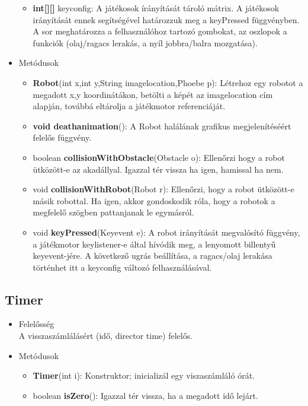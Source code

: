 \begin{itemize}
\begin{itemize}
		\item \textbf{int[][]} keyconfig: A játékosok írányítását tároló mátrix. A játékosok irányítását ennek segítségével határozzuk meg a keyPressed függvényben. A sor meghatározza a felhasználóhoz tartozó gombokat, az oszlopok a funkciók (olaj/ragacs lerakás, a nyíl jobbra/balra mozgatása).
\end{itemize}
\item Metódusok\\
	\begin{itemize}
		\item \textbf{Robot}(int x,int y,String imagelocation,Phoebe p): Létrehoz egy robotot a megadott x,y koordinátákon, betölti a képét az imagelocation cím alapján, továbbá eltárolja a játékmotor referenciáját.
		\item \textbf{void deathanimation}(): A Robot halálának grafikus megjelenítéséért felelős függvény.
		\item boolean \textbf{collisionWithObstacle}(Obstacle o): Ellenőrzi hogy a robot ütközött-e az akadállyal. Igazzal tér vissza ha igen, hamissal ha nem.
		\item void \textbf{collisionWithRobot}(Robot r): Ellenőrzi, hogy a robot ütközött-e másik robottal. Ha igen, akkor gondoskodik róla, hogy a robotok a megfelelő szögben pattanjanak le egymásról.
		\item void \textbf{keyPressed}(Keyevent e): A robot irányítását megvalósító függvény, a játékmotor keylistener-e által hívódik meg, a lenyomott billentyű keyevent-jére. A következő ugrás beállítása, a ragacs/olaj lerakása történhet itt a keyconfig változó felhasználásával.
	\end{itemize}
\end{itemize}

\subsection{Timer}
\begin{itemize}
\item Felelősség\\
A visszaszámlálásért (idő, director time) felelős.
\item Metódusok
	\begin{itemize}
		\item \textbf{Timer}(int i): Konstruktor; inicializál egy viszaszámláló órát.
		\item boolean \textbf{isZero}(): Igazzal tér vissza, ha a megadott idő lejárt.
	\end{itemize}
\end{itemize}

